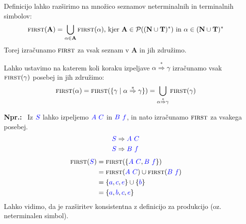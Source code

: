 \documentclass{article}
\newcommand{\Ex}{\textbf{Npr.:}\ }
\newcommand{\FIRST}{\textsc{first}}
\newcommand{\Set}[1]{\mathbf{#1}}
\newcommand{\Symbol}[1]{\textcolor{blue}{#1}}
\newcommand{\Terminals}{\Set{T}}
\newcommand{\NonTerminals}{\Set{N}}
\newcommand{\Powerset}[1]{\mathcal{P}(#1)}
\newcommand{\Derive}{\Rightarrow}
\newcommand{\DeriveStar}{\overset{\ast}{\Rightarrow}}
\newcommand{\Seq}{\ }
\newcommand{\Kleene}[1]{#1^\ast}
\begin{document}
Definicijo lahko razširimo na množico seznamov neterminalnih in terminalnih simbolov:
\begin{equation*}
  \FIRST(\Set{A}) = \bigcup_{\alpha \in \Set{A}} \FIRST(\alpha) \text{, kjer } \Set{A} \in \Powerset{\Kleene{(\NonTerminals \cup \Terminals)}} \text{ in } \alpha \in \Kleene{(\NonTerminals \cup \Terminals)}
\end{equation*}
Torej izračunamo $\FIRST$ za vsak seznam v $\Set{A}$ in jih združimo.

Lahko ustavimo na katerem koli koraku izpeljave $\alpha \DeriveStar \gamma$ izračunamo vsak $\FIRST(\gamma)$ posebej in jih združimo:
\begin{equation*}
  \FIRST(\alpha) = \FIRST(\{\gamma \mid \alpha \DeriveStar \gamma\}) = \bigcup_{\alpha \DeriveStar \gamma} \FIRST(\gamma)
\end{equation*}

\Ex
  Iz $\Symbol{S}$ lahko izpeljemo $\Symbol{A} \Seq \Symbol{C}$ in $\Symbol{B} \Seq \Symbol{f}$, in nato izračunamo $\FIRST$ za vsakega posebej.
  \begin{align*}
    \Symbol{S} &\Derive \Symbol{A} \Seq \Symbol{C}\\
    \Symbol{S} &\Derive \Symbol{B} \Seq \Symbol{f}
  \end{align*}
  \begin{align*}
    \FIRST(\Symbol{S}) &= \FIRST(\{\Symbol{A} \Seq \Symbol{C}, \Symbol{B} \Seq \Symbol{f}\}) \\
              &= \FIRST(\Symbol{A} \Seq \Symbol{C}) \cup \FIRST(\Symbol{B} \Seq \Symbol{f})\\
              &= \{\Symbol{a}, \Symbol{c}, \Symbol{e}\} \cup \{\Symbol{b}\} \\
              &= \{\Symbol{a}, \Symbol{b}, \Symbol{c}, \Symbol{e}\}
  \end{align*}
  Lahko vidimo, da je razširitev konsistentna z definicijo za produkcijo (oz. neterminalen simbol).
\end{document}
